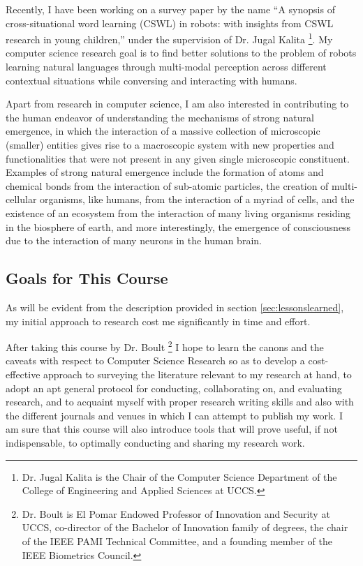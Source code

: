 \documentclass[journal]{IEEEtran}
\begin{document}
\noindent Recently, I have been working on a survey paper by the name ``A synopsis of cross-situational word learning (CSWL) in robots: with insights from CSWL research in young children,'' under the supervision of Dr. Jugal Kalita \footnote{Dr. Jugal Kalita is the Chair of the Computer Science Department of the College of Engineering and Applied Sciences at UCCS.}. My computer science research goal is to find better solutions to the problem of robots learning natural languages through multi-modal perception across different contextual situations while conversing and interacting with humans.  

\noindent Apart from research in computer science, I am also interested in contributing to the human endeavor of understanding the mechanisms of strong natural emergence, in which the interaction of a massive collection of microscopic (smaller) entities gives rise to a macroscopic system with new properties and functionalities that were not present in any given single microscopic constituent. Examples of strong natural emergence include the formation of atoms and chemical bonds from the interaction of sub-atomic particles, the creation of multi-cellular organisms, like humans, from the interaction of a myriad of cells, and the existence of an ecosystem from the interaction of many living organisms residing in the biosphere of earth, and more interestingly, the emergence of consciousness due to the interaction of many neurons in the human brain.  

\subsection{Goals for This Course}   
\label{sec:coursegoals}  

\noindent As will be evident from the description provided in section \ref{sec:lessonslearned}, my initial approach to research cost me significantly in time and effort.  

\noindent After taking this course by Dr. Boult \footnote{Dr. Boult is El Pomar Endowed Professor of Innovation and Security at UCCS, co-director of the Bachelor of Innovation family of degrees, the chair of the IEEE PAMI Technical Committee, and a founding member of the IEEE Biometrics Council.} I hope to learn the canons and the caveats with respect to Computer Science Research so as to develop a cost-effective approach to surveying the literature relevant to my research at hand, to adopt an apt general protocol for conducting, collaborating on, and evaluating research, and to acquaint myself with proper research writing skills and also with the different journals and venues in which I can attempt to publish my work. I am sure that this course will also introduce tools that will prove useful, if not indispensable, to optimally conducting and sharing my research work.   
\end{document}
